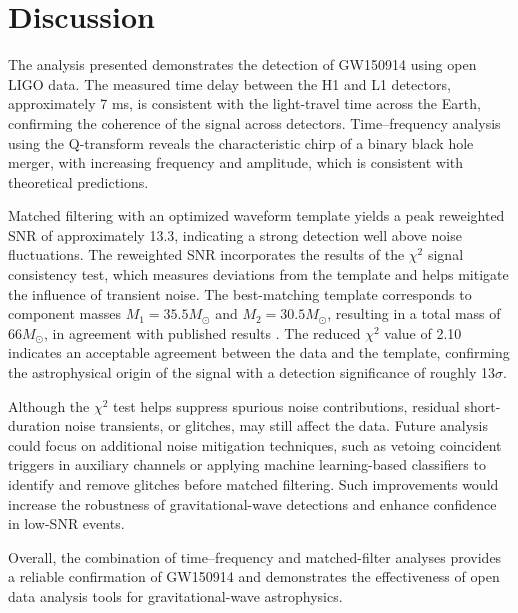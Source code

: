 \section{Discussion}

The analysis presented demonstrates the detection of GW150914 using open LIGO data. The measured time delay between the H1 and L1 detectors, approximately 7 ms, is consistent with the light-travel time across the Earth, confirming the coherence of the signal across detectors. Time–frequency analysis using the Q-transform reveals the characteristic chirp of a binary black hole merger, with increasing frequency and amplitude, which is consistent with theoretical predictions. 

Matched filtering with an optimized waveform template yields a peak reweighted SNR of approximately 13.3, indicating a strong detection well above noise fluctuations. The reweighted SNR incorporates the results of the $\chi^2$ signal consistency test, which measures deviations from the template and helps mitigate the influence of transient noise. The best-matching template corresponds to component masses $M_1 = 35.5 M_\odot$ and $M_2 = 30.5 M_\odot$, resulting in a total mass of $66 M_\odot$, in agreement with published results \cite{Abbott2016Discovery}. The reduced $\chi^2$ value of 2.10 indicates an acceptable agreement between the data and the template, confirming the astrophysical origin of the signal with a detection significance of roughly 13$\sigma$.

Although the $\chi^2$ test helps suppress spurious noise contributions, residual short-duration noise transients, or glitches, may still affect the data. Future analysis could focus on additional noise mitigation techniques, such as vetoing coincident triggers in auxiliary channels or applying machine learning-based classifiers to identify and remove glitches before matched filtering. Such improvements would increase the robustness of gravitational-wave detections and enhance confidence in low-SNR events.

Overall, the combination of time–frequency and matched-filter analyses provides a reliable confirmation of GW150914 and demonstrates the effectiveness of open data analysis tools for gravitational-wave astrophysics.

